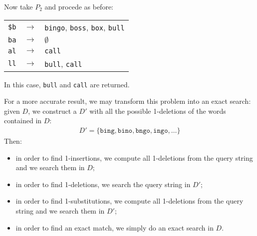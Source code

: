Now take $P_2$ and procede as before:
%
\begin{longtable}{ccl}
  \texttt{\$b} & $\rightarrow$ & \texttt{bingo}, \texttt{boss},
  \texttt{box}, \texttt{bull} \\
  \texttt{ba} & $\rightarrow$ & $\emptyset$ \\
  \texttt{al} & $\rightarrow$ & \texttt{call} \\
  \texttt{ll} & $\rightarrow$ & \texttt{bull}, \texttt{call} 
\end{longtable}
%
In this case, \texttt{bull} and \texttt{call} are returned.

For a more accurate result, we may transform this problem into an exact search:
given $D$, we construct a $D'$ with all the possible 1-deletions of the words
contained in $D$:
%
\begin{align*}
  D' = \{ \texttt{bing}, \texttt{bino}, \texttt{bngo}, \texttt{ingo}, \dots \}
\end{align*}
%
Then:
%
\begin{itemize}

  \item in order to find 1-insertions, we compute all 1-deletions from the query
  string and we search them in $D$;

  \item in order to find 1-deletions, we search the query string in $D'$;

  \item in order to find 1-substitutions, we compute all 1-deletions from the
  query string and we search them in $D'$;

  \item in order to find an exact match, we simply do an exact search in $D$.

\end{itemize}
